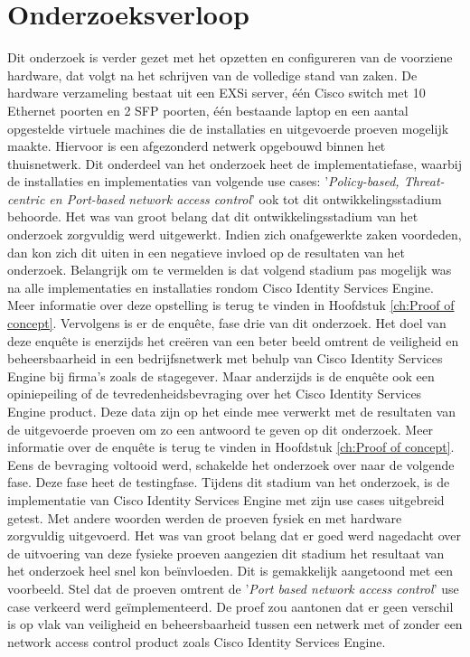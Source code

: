 \section{Onderzoeksverloop}
Dit onderzoek is verder gezet met het opzetten en configureren van de voorziene hardware, dat volgt na het schrijven van de volledige stand van zaken. De hardware verzameling bestaat uit een EXSi server, één Cisco switch met 10 Ethernet poorten en 2 SFP poorten, één bestaande laptop en een aantal opgestelde virtuele machines die de installaties en uitgevoerde proeven mogelijk maakte. Hiervoor is een afgezonderd netwerk opgebouwd binnen het thuisnetwerk. 
Dit onderdeel van het onderzoek heet de implementatiefase, waarbij de installaties en implementaties van volgende use cases: '\textit{Policy-based, Threat-centric en Port-based network access control}' ook tot dit ontwikkelingsstadium behoorde. 
\newline
\newline
Het was van groot belang dat dit ontwikkelingsstadium van het onderzoek zorgvuldig werd uitgewerkt. Indien zich onafgewerkte zaken voordeden, dan kon zich dit uiten in een negatieve invloed op de resultaten van het onderzoek. 
Belangrijk om te vermelden is dat volgend stadium pas mogelijk was na alle implementaties en installaties rondom Cisco Identity Services Engine. Meer informatie over deze opstelling is terug te vinden in Hoofdstuk \ref{ch:Proof of concept}.
\newline
\newline
Vervolgens is er de enquête, fase drie van dit onderzoek. Het doel van deze enquête is enerzijds het creëren van een beter beeld omtrent de veiligheid en beheersbaarheid in een bedrijfsnetwerk met behulp van Cisco Identity Services Engine bij firma’s zoals de stagegever. Maar anderzijds is de enquête ook een opiniepeiling of de tevredenheidsbevraging over het Cisco Identity Services Engine product. Deze data zijn op het einde mee verwerkt met de resultaten van de uitgevoerde proeven om zo een antwoord te geven op dit onderzoek. Meer informatie over de enquête is terug te vinden in Hoofdstuk \ref{ch:Proof of concept}.
\newline
\newline
Eens de bevraging voltooid werd, schakelde het onderzoek over naar de volgende fase. Deze fase heet de testingfase. Tijdens dit stadium van het onderzoek, is de implementatie van Cisco Identity Services Engine met zijn use cases uitgebreid getest. Met andere woorden werden de proeven fysiek en met hardware zorgvuldig uitgevoerd. Het was van groot belang dat er goed werd nagedacht over de uitvoering van deze fysieke proeven aangezien dit stadium het resultaat van het onderzoek heel snel kon beïnvloeden. Dit is gemakkelijk aangetoond met een voorbeeld. Stel dat de proeven omtrent de '\textit{Port based network access control}' use case verkeerd werd geïmplementeerd. De proef zou aantonen dat er geen verschil is op vlak van veiligheid en beheersbaarheid tussen een netwerk met of zonder een network access control product zoals Cisco Identity Services Engine. 
